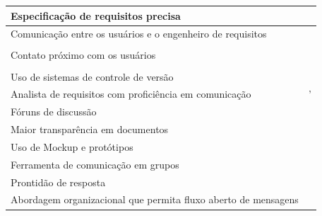 \begin{longtable}{|p{5cm}|p{10cm}|}
Especificação de requisitos precisa                                          & \cite{5457325} \cite{tu2016experiment} \cite{unknown2006}
 \cite{Takura19961716}            
        \\ \hline
Comunicação entre os usuários e o engenheiro de requisitos                    &  \cite{hagelstein1988declarative} \cite{laporti2009athena}             \cite{8051365}                                                       \\     \\\hline
Contato próximo com os usuários                                               & \cite{hagelstein1988declarative} \cite{laporti2009athena}             \cite{Rauterberg1995391}                                              \\     \\\hline
Uso de sistemas de controle de versão                                         &    \cite{wasson2006case} \cite{6606709}                                \\ \hline
Analista de requisitos com proficiência em comunicação                        & \cite{sedelmaier2017can} \cite{Anwar2016726}                '            \\ \hline
Fóruns de discussão                                                           & \cite{alnuem2012requirements} \cite{8051365}                          \\ \hline
Maior transparência em documentos                                             & \cite{Oran:2017:ARC:3131151.3131166}     \cite{liskin2015artifacts}                                                     \\ \hline
Uso de Mockup e protótipos                                                    & \cite{Oran:2017:ARC:3131151.3131166} \cite{calazans2017software}        
            \\ \hline

Ferramenta de comunicação em grupos                                           &  \cite{bjarnason2017role}                                                \\ \hline
Prontidão de resposta                                                         & \cite{KIRITANI2015153}                                                    \\ \hline


Abordagem organizacional que permita fluxo aberto de mensagens                & \cite{6051643}                                                         \\ \hline






\end{longtable}

